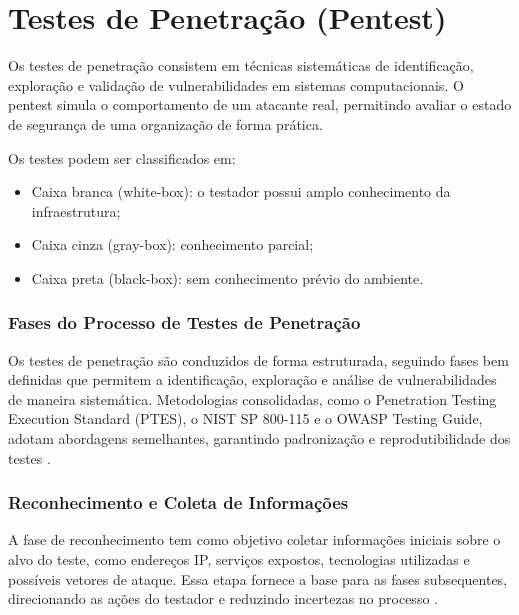 \section{Testes de Penetração (Pentest)}
    Os testes de penetração consistem em técnicas sistemáticas de identificação, exploração
    e validação de vulnerabilidades em sistemas computacionais. O pentest simula o comportamento 
    de um atacante real, permitindo avaliar o estado de segurança de uma organização de forma prática\citep{moreno2019introduccao}.

    Os testes podem ser classificados em:
    \begin{itemize}
        \item Caixa branca (white-box): o testador possui amplo conhecimento da infraestrutura;
        \item Caixa cinza (gray-box): conhecimento parcial;
        \item Caixa preta (black-box): sem conhecimento prévio do ambiente.
    \end{itemize}

    \subsubsection{Fases do Processo de Testes de Penetração}

        Os testes de penetração são conduzidos de forma estruturada, seguindo fases bem definidas que permitem
        a identificação, exploração e análise de vulnerabilidades de maneira sistemática. Metodologias consolidadas,
        como o Penetration Testing Execution Standard (PTES), o NIST SP 800-115 e o OWASP Testing Guide, adotam abordagens
        semelhantes, garantindo padronização e reprodutibilidade dos testes \citep{moreno2019introduccao}.

        
        

        \subsubsection*{Reconhecimento e Coleta de Informações}

        A fase de reconhecimento tem como objetivo coletar informações iniciais sobre o alvo do teste, como endereços IP,
         serviços expostos, tecnologias utilizadas e possíveis vetores de ataque. Essa etapa fornece a base para as fases
          subsequentes, direcionando as ações do testador e reduzindo incertezas no processo \citep{stallings2017network}.

